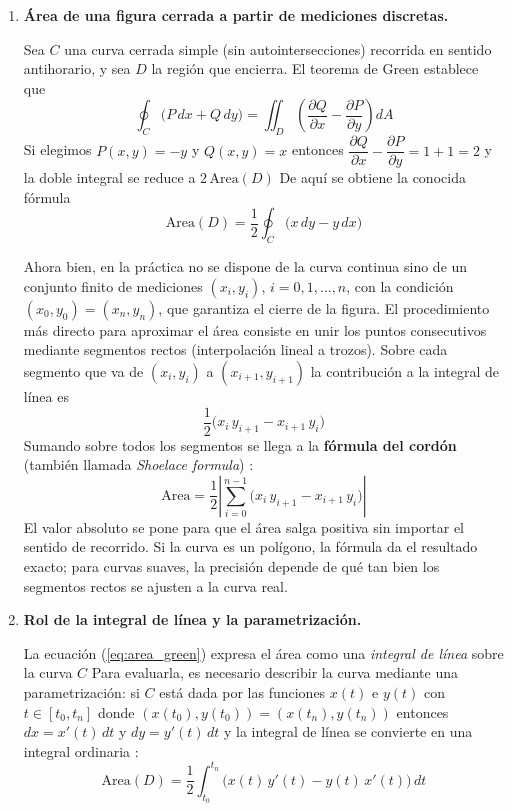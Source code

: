 \documentclass[12pt]{article}
\begin{document}
\begin{enumerate}
	\item \textbf{Área de una figura cerrada a partir de mediciones discretas.}

	Sea $C$ una curva cerrada simple (sin autointersecciones) recorrida en sentido antihorario, y sea $D$ la región que encierra. El teorema de Green establece que \cite{stewart12, mathworld_green}
	\[
	\oint_C \bigl(P\,dx + Q\,dy\bigr) = \iint_D \left(\frac{\partial Q}{\partial x} - \frac{\partial P}{\partial y}\right) dA
	\]
	Si elegimos $P(x,y) = -y$ y $Q(x,y) = x$ entonces $\dfrac{\partial Q}{\partial x} - \dfrac{\partial P}{\partial y} = 1 + 1 = 2$ y la doble integral se reduce a $2\,\text{Area}(D)$ De aquí se obtiene la conocida fórmula
	\begin{equation}\label{eq:area_green}
	\text{Area}(D) = \frac{1}{2}\oint_C \bigl(x\,dy - y\,dx\bigr)
	\end{equation}

	Ahora bien, en la práctica no se dispone de la curva continua sino de un conjunto finito de mediciones $(x_i, y_i)$, $i=0,1,\ldots,n$, con la condición $(x_0,y_0) = (x_n,y_n)$, que garantiza el cierre de la figura. El procedimiento más directo para aproximar el área consiste en unir los puntos consecutivos mediante segmentos rectos (interpolación lineal a trozos). Sobre cada segmento que va de $(x_i, y_i)$ a $(x_{i+1}, y_{i+1})$ la contribución a la integral de línea es
	\[
	\frac{1}{2}\bigl(x_i\,y_{i+1} - x_{i+1}\,y_i\bigr)
	\]
	Sumando sobre todos los segmentos se llega a la \textbf{fórmula del cordón} (también llamada \textit{Shoelace formula}) \cite{mathworld_shoelace}:
	\begin{equation}\label{eq:shoelace}
	\text{Area} = \frac{1}{2}\left|\sum_{i=0}^{n-1}\bigl(x_i\,y_{i+1} - x_{i+1}\,y_i\bigr)\right|
	\end{equation}
	El valor absoluto se pone para que el área salga positiva sin importar el sentido de recorrido. Si la curva es un polígono, la fórmula da el resultado exacto; para curvas suaves, la precisión depende de qué tan bien los segmentos rectos se ajusten a la curva real.

	\item \textbf{Rol de la integral de línea y la parametrización.}

	La ecuación (\ref{eq:area_green}) expresa el área como una \textit{integral de línea} sobre la curva $C$ Para evaluarla, es necesario describir la curva mediante una parametrización: si $C$ está dada por las funciones $x(t)$ e $y(t)$ con $t\in[t_0, t_n]$ donde $(x(t_0),y(t_0)) = (x(t_n),y(t_n))$ entonces $dx = x'(t)\,dt$ y $dy = y'(t)\,dt$ y la integral de línea se convierte en una integral ordinaria \cite{stewart12}:
	\begin{equation}\label{eq:area_param}
	\text{Area}(D) = \frac{1}{2}\int_{t_0}^{t_n} \bigl(x(t)\,y'(t) - y(t)\,x'(t)\bigr)\,dt
	\end{equation}


\end{enumerate}
\end{document}
